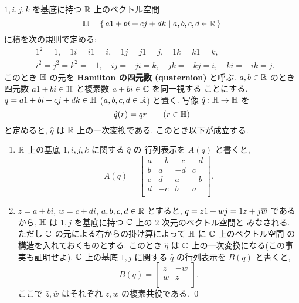 \documentclass[12pt,twoside]{jarticle}
\begin{document}
\begin{question}
  $1,i,j,k$ を基底に持つ ${\mathbb R}$ 上のベクトル空間
  \begin{equation*}
    {\mathbb H} = \{\, a1 + bi + cj + dk \mid a,b,c,d\in{\mathbb R} \,\}
  \end{equation*}
  に積を次の規則で定める:
  \begin{align*}
    &
    1^2=1, \quad
    1i=i1=i, \quad 1j=j1=j, \quad 1k=k1=k, \quad 
    \\ &
    i^2=j^2=k^2=-1, \quad
    ij=-ji=k, \quad jk=-kj=i, \quad ki=-ik=j.
  \end{align*}
  このとき ${\mathbb H}$ の元を {\bf Hamilton の四元数 (quaternion)} と呼ぶ.
  $a,b\in{\mathbb R}$ のとき四元数 $a1+bi\in{\mathbb H}$ と複素数 $a+bi\in{\mathbb C}$ を同一視する
  ことにする.
  $q = a1 + bi + cj + dk\in{\mathbb H}$ ($a,b,c,d\in{\mathbb R}$) と置く.
  写像 $\hat{q}:{\mathbb H}\to{\mathbb H}$ を
  \begin{equation*}
    \hat{q}(r) = qr \qquad (r\in{\mathbb H})
  \end{equation*}
  と定めると, $\hat{q}$ は ${\mathbb R}$ 上の一次変換である.  このとき以下が成立する.
  \begin{enumerate}
  \item ${\mathbb R}$ 上の基底 $1,i,j,k$ に関する $\hat{q}$ の
    行列表示を $A(q)$ と書くと,
    \begin{equation*}
      A(q) = 
      \left[
      \begin{array}{rrrr}
        a & -b & -c & -d \\
        b &  a & -d &  c \\
        c &  d &  a & -b \\
        d & -c &  b &  a \\
      \end{array}
      \right].
    \end{equation*}
  \item $z=a+bi$, $w=c+di$, $a,b,c,d\in{\mathbb R}$ とすると, $q=z1+wj=1z+j\overline{w}$ である
    から,  ${\mathbb H}$ は $1,j$ を基底に持つ ${\mathbb C}$ 上の $2$ 次元のベクトル空間と
    みなされる.  
    ただし ${\mathbb C}$ の元による右からの掛け算によって ${\mathbb H}$ に ${\mathbb C}$ 上のベクトル空間
    の構造を入れておくものとする.
    このとき $\hat{q}$ は ${\mathbb C}$ 上の一次変換になる(この事実も証明せよ).
    ${\mathbb C}$ 上の基底 $1,j$ に関する $\hat{q}$ の行列表示を $B(q)$ と書くと,
    \begin{equation*}
      B(q) = 
      \begin{bmatrix}
        z       & -w \\
        \bar{w} & \bar{z} \\
      \end{bmatrix}.
    \end{equation*}
    ここで $\bar{z},\bar{w}$ はそれぞれ $z,w$ の複素共役である. \qed
  \end{enumerate}
\end{question}
\end{document}
